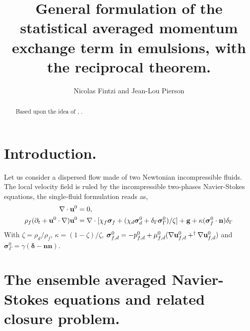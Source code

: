 \documentclass[12pt]{My_preprint}
\title{
    General formulation of the statistical averaged momentum exchange term in emulsions, with the reciprocal theorem.
}
\author[1,2]{Nicolas Fintzi and  Jean-Lou Pierson}
\begin{document}
\maketitle

\begin{abstract}
    Based upon the idea of \citet{hinch1977averaged}, .
\end{abstract}


\section{Introduction.}

Let us consider a dispersed flow made of two Newtonian incompressible fluids.
The local velocity field is ruled by the incompressible two-phases Navier-Stokes equations, the single-fluid formulation reads as,
\begin{align}
\div \textbf{u}^0 &= 0, \\
\rho_f (\pddt + \textbf{u}^0 \cdot \grad) \textbf{u}^0
&= 
\div [\chi_f \bm\sigma_f + (\chi_d \bm\sigma_d^0 + \delta_\Gamma \bm\sigma^0_\Gamma)/\zeta]
+ \textbf{g}
+ \kappa (\bm\sigma_f^0 \cdot \textbf{n}) \delta_\Gamma
\label{eq:local_NS}
\end{align}
With $\zeta = \rho_d/\rho_f$, $\kappa = (1 - \zeta)/\zeta$, $\bm\sigma_{f,d}^0 = -p_{f,d}^0 + \mu_{f,d}^0 (\mathbf{\nabla} \textbf{u}_{f,d}^0+ ^\dagger\mathbf{\nabla} \textbf{u}_{f,d}^0)$ and $\bm\sigma_\Gamma^0 =\gamma (\bm\delta - \textbf{nn})$. 

\section{The ensemble averaged Navier-Stokes equations and related closure problem.}
\end{document}

